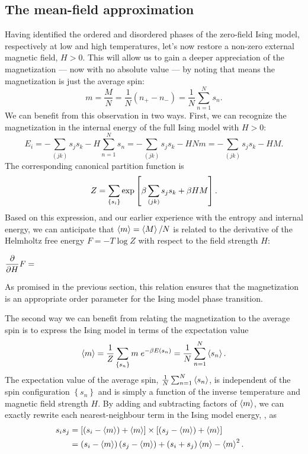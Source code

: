 \subsection{\label{sec:mean_field}The mean-field approximation}
Having identified the ordered and disordered phases of the zero-field Ising model, respectively at low and high temperatures, let's now restore a non-zero external magnetic field, $H > 0$.
This will allow us to gain a deeper appreciation of the magnetization --- now with no absolute value --- by noting that  means the magnetization is just the average spin:
\begin{equation*}
  m = \frac{M}{N} = \frac{1}{N}\left(n_+ - n_-\right) = \frac{1}{N} \sum_{n = 1}^N s_n.
\end{equation*}
We can benefit from this observation in two ways.
First, we can recognize the magnetization in the internal energy of the full Ising model with $H >0$:
\begin{equation*}
  E_i = -\sum_{(jk)} s_j s_k - H \sum_{n = 1}^N s_n = -\sum_{(jk)} s_j s_k - H N m = -\sum_{(jk)} s_j s_k - H M.
\end{equation*}
The corresponding canonical partition function is
\begin{equation*}
  Z = \sum_{\left\{s_i\right\}} \exp\left[\beta \sum_{(jk)} s_j s_k + \beta H M\right].
\end{equation*}
Based on this expression, and our earlier experience with the entropy and internal energy, we can anticipate that $\left\langle m \right\rangle = \left\langle M \right\rangle / N$ is related to the derivative of the Helmholtz free energy $F = -T\log Z$ with respect to the field strength $H$:
\begin{mdframed}
  $\displaystyle \frac{\partial }{\partial H} F = $ \\[100 pt]
\end{mdframed}
As promised in the previous section, this relation ensures that the magnetization is an appropriate order parameter for the Ising model phase transition.

The second way we can benefit from relating the magnetization to the average spin is to express the Ising model in terms of the expectation value
\begin{equation*}
  \left\langle m \right\rangle = \frac{1}{Z} \sum_{\left\{s_n\right\}} m \; e^{-\beta E(s_n)} = \frac{1}{N} \sum_{n = 1}^N \left\langle s_n \right\rangle.
\end{equation*}
The expectation value of the average spin, $\frac{1}{N} \sum_{n = 1}^N \left\langle s_n \right\rangle$, is independent of the spin configuration $\left\{s_n\right\}$ and is simply a function of the inverse temperature \be and magnetic field strength $H$.
By adding and subtracting factors of $\left\langle m \right\rangle$, we can exactly rewrite each nearest-neighbour term in the Ising model energy, , as
\begin{align}
  s_i s_j & = \left[\left(s_i - \left\langle m \right\rangle\right) + \left\langle m \right\rangle\right] \times \left[\left(s_j - \left\langle m \right\rangle\right) + \left\langle m \right\rangle\right] \cr
          & = \left(s_i - \left\langle m \right\rangle\right) \left(s_j - \left\langle m \right\rangle\right) + \left(s_i + s_j\right)\left\langle m \right\rangle - \left\langle m \right\rangle^2. \label{eq:MF_start}
\end{align}

